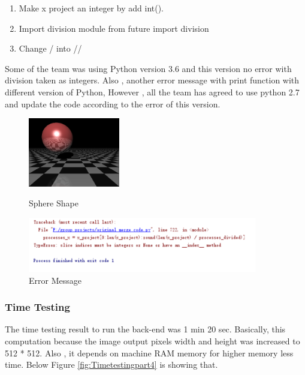 \documentclass[a4paper, 12pt]{article}
\begin{document}
\begin{enumerate}
\item Make x project an integer by add int().
\item Import division module from future import division
\item Change / into //
\end{enumerate}


Some of the team was using Python version 3.6 and this version no error with division taken as integers. Also , another error message with print function with different version of Python, However , all the team has agreed to use python 2.7 and update the code according to the error of this version.

\begin{figure}[htbp]
\centering
\begin{minipage}[t]{0.38\textwidth}
\centering
\includegraphics[width=4cm]{ShD_Sphere_Pic.png}
\caption{Sphere Shape}
\label{fig:SphereShape}
\end{minipage}
\begin{minipage}[t]{0.48\textwidth}
\centering
\includegraphics[width=10cm]{ShD_error_message.png}
\caption{Error Message}
\label{fig:Error}
\end{minipage}
\end{figure}


\subsubsection{Time Testing}
The time testing result to run the back-end was 1 min 20 sec. Basically, this computation because the image output pixels width and height was increased to 512 * 512. Also , it depends on machine RAM memory for higher memory less time. Below Figure \ref{fig:Timetestingpart4} is showing that.
\end{document}
